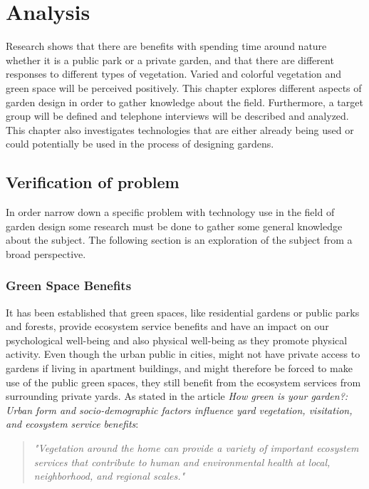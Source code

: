 \chapter{Analysis}
Research shows that there are benefits with spending time around nature whether it is a public park or a private garden\cite{healthBenefitsNature}, and that there are different responses to different types of vegetation\cite{wowFactor}. Varied and colorful vegetation and green space will be perceived positively. This chapter explores different aspects of garden design in order to gather knowledge about the field. Furthermore, a target group will be defined and telephone interviews will be described and analyzed. This chapter also investigates technologies that are either already being used or could potentially be used in the process of designing gardens. 

\section{Verification of problem}\label{sec:verification}
In order narrow down a specific problem with technology use in the field of garden design some research must be done to gather some general knowledge about the subject. The following section is an exploration of the subject from a broad perspective.

\subsection{Green Space Benefits}
It has been established that green spaces, like residential gardens or public parks and forests, provide ecosystem service benefits and have an impact on our psychological well-being and also physical well-being as they promote physical activity\cite{urbanGreenSpace}\cite{healthBenefitsNature}. Even though the urban public in cities, might not have private access to gardens if living in apartment buildings, and might therefore be forced to make use of the public green spaces, they still benefit from the ecosystem services from surrounding private yards\cite{greenSpaceBenefits}. As stated in the article \textit{How green is your garden?: Urban form and socio-demographic factors influence yard vegetation, visitation, and ecosystem service benefits}:\\

\begin{quote}
	\textit{"Vegetation around the home can provide a variety of important ecosystem services that contribute to human and environmental health at local, neighborhood, and regional scales\label{articleQuote}."}\\
\end{quote}

